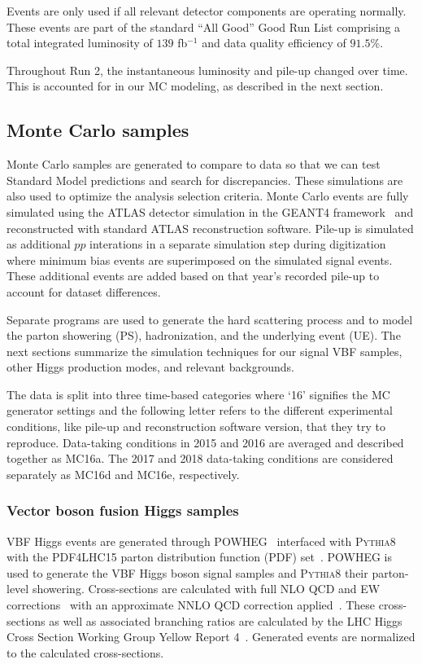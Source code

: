 Events are only used if all relevant detector components are operating normally. These events are part of the standard ``All Good'' Good Run List comprising a total integrated luminosity of $139$ fb$^{-1}$ and data quality efficiency of $91.5$\%.

Throughout Run 2, the instantaneous luminosity and pile-up changed over time. This is accounted for in our MC modeling, as described in the next section.

\subsection{Monte Carlo samples}

Monte Carlo samples are generated to compare to data so that we can test Standard Model predictions and search for discrepancies. These simulations are also used to optimize the analysis selection criteria. Monte Carlo events are fully simulated using the ATLAS detector simulation in the GEANT4 framework~\cite{GEANT4} and reconstructed with standard ATLAS reconstruction software. Pile-up is simulated as additional $pp$ interations in a separate simulation step during digitization where minimum bias events are superimposed on the simulated signal events. These additional events are added based on that year's recorded pile-up to account for dataset differences. 

Separate programs are used to generate the hard scattering process and to model the parton showering (PS), hadronization, and the underlying event (UE). The next sections summarize the simulation techniques for our signal VBF samples, other Higgs production modes, and relevant backgrounds.   

The data is split into three time-based categories where `16' signifies the MC generator settings and the following letter refers to the different experimental conditions, like pile-up and reconstruction software version, that they try to reproduce. Data-taking conditions in 2015 and 2016 are averaged and described together as MC16a. The 2017 and 2018 data-taking conditions are considered separately as MC16d and MC16e, respectively. 

\subsubsection{Vector boson fusion Higgs samples}

VBF Higgs events are generated through \textsc{POWHEG}~\cite{Nason:2009ai} interfaced with \textsc{Pythia8}~\cite{pythia8} with the PDF4LHC15 parton distribution function (PDF) set~\cite{PDF4LHC15}. \textsc{POWHEG} is used to generate the VBF Higgs boson signal samples and \textsc{Pythia8} their parton-level showering. Cross-sections are calculated with full NLO QCD and EW corrections~\cite{Ciccolini:2007jr, Arnold:2008rz} with an approximate NNLO QCD correction applied~\cite{Bolzoni:2010xr}. These cross-sections as well as associated branching ratios are calculated by the LHC Higgs Cross Section Working Group Yellow Report 4~\cite{LHCCrossSectionWG}. Generated events are normalized to the calculated cross-sections. 
